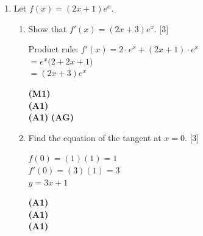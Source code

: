 \documentclass[12pt, twoside]{article}
\begin{document}
\begin{enumerate}[itemsep=0.2cm]
\begin{enumerate}[itemsep=0.3cm]
  \begin{minipage}[t]{0.62\textwidth}
  $g(x) = 2x^3 - x^2 + c$\\[0.15cm]
  $g(1) = 2 - 1 + c = 7$\\[0.15cm]
  $c = 6$\\[0.15cm]
  $g(x) = 2x^3 - x^2 + 6$
  \end{minipage}%
  \begin{minipage}[t]{0.35\textwidth}\raggedleft
  \textbf{(M1)}\\[0.15cm]
  \textbf{(M1)}\\[0.15cm]
  \textbf{(A1)}\\[0.15cm]
  \textbf{(A1)}
  \end{minipage}
\end{enumerate}

\newpage

\item Let $f(x) = (2x + 1)e^x$.

\begin{enumerate}[itemsep=0.3cm]
  \item Show that $f'(x) = (2x + 3)e^x$. \hfill [3]

  \begin{minipage}[t]{0.62\textwidth}
  Product rule: $f'(x) = 2 \cdot e^x + (2x + 1) \cdot e^x$\\[0.15cm]
  $= e^x\big(2 + 2x + 1\big)$\\[0.15cm]
  $= (2x + 3)e^x$
  \end{minipage}%
  \begin{minipage}[t]{0.35\textwidth}\raggedleft
  \textbf{(M1)}\\[0.15cm]
  \textbf{(A1)}\\[0.15cm]
  \textbf{(A1)} \textbf{(AG)}
  \end{minipage}

  \medskip
  \item Find the equation of the tangent at $x = 0$. \hfill [3]

  \begin{minipage}[t]{0.62\textwidth}
  $f(0) = (1)(1) = 1$\\[0.15cm]
  $f'(0) = (3)(1) = 3$\\[0.15cm]
  $y = 3x + 1$
  \end{minipage}%
  \begin{minipage}[t]{0.35\textwidth}\raggedleft
  \textbf{(A1)}\\[0.15cm]
  \textbf{(A1)}\\[0.15cm]
  \textbf{(A1)}
  \end{minipage}


\end{enumerate}
\end{enumerate}
\end{document}
